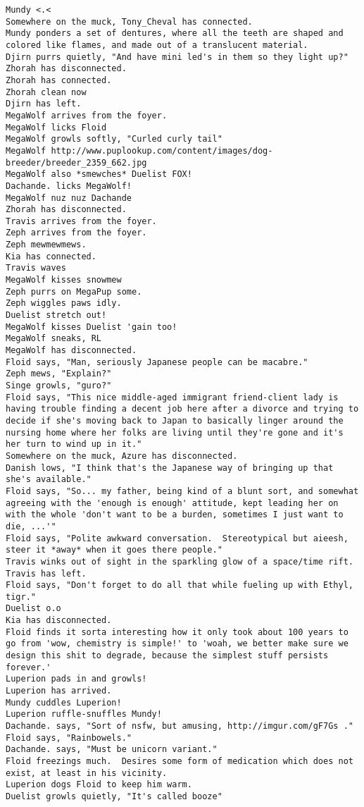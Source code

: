 \begin{verbatim}
Mundy <.<
Somewhere on the muck, Tony_Cheval has connected.
Mundy ponders a set of dentures, where all the teeth are shaped and colored like flames, and made out of a translucent material.
Djirn purrs quietly, "And have mini led's in them so they light up?"
Zhorah has disconnected.
Zhorah has connected.
Zhorah clean now
Djirn has left.
MegaWolf arrives from the foyer.
MegaWolf licks Floid
MegaWolf growls softly, "Curled curly tail"
MegaWolf http://www.puplookup.com/content/images/dog-breeder/breeder_2359_662.jpg
MegaWolf also *smewches* Duelist FOX!
Dachande. licks MegaWolf!
MegaWolf nuz nuz Dachande
Zhorah has disconnected.
Travis arrives from the foyer.
Zeph arrives from the foyer.
Zeph mewmewmews.
Kia has connected.
Travis waves
MegaWolf kisses snowmew
Zeph purrs on MegaPup some.
Zeph wiggles paws idly.
Duelist stretch out!
MegaWolf kisses Duelist 'gain too!
MegaWolf sneaks, RL
MegaWolf has disconnected.
Floid says, "Man, seriously Japanese people can be macabre."
Zeph mews, "Explain?"
Singe growls, "guro?"
Floid says, "This nice middle-aged immigrant friend-client lady is having trouble finding a decent job here after a divorce and trying to decide if she's moving back to Japan to basically linger around the nursing home where her folks are living until they're gone and it's her turn to wind up in it."
Somewhere on the muck, Azure has disconnected.
Danish lows, "I think that's the Japanese way of bringing up that she's available."
Floid says, "So... my father, being kind of a blunt sort, and somewhat agreeing with the 'enough is enough' attitude, kept leading her on with the whole 'don't want to be a burden, sometimes I just want to die, ...'"
Floid says, "Polite awkward conversation.  Stereotypical but aieesh, steer it *away* when it goes there people."
Travis winks out of sight in the sparkling glow of a space/time rift.
Travis has left.
Floid says, "Don't forget to do all that while fueling up with Ethyl, tigr."
Duelist o.o
Kia has disconnected.
Floid finds it sorta interesting how it only took about 100 years to go from 'wow, chemistry is simple!' to 'woah, we better make sure we design this shit to degrade, because the simplest stuff persists forever.'
Luperion pads in and growls!
Luperion has arrived.
Mundy cuddles Luperion!
Luperion ruffle-snuffles Mundy!
Dachande. says, "Sort of nsfw, but amusing, http://imgur.com/gF7Gs ."
Floid says, "Rainbowels."
Dachande. says, "Must be unicorn variant."
Floid freezings much.  Desires some form of medication which does not exist, at least in his vicinity.
Luperion dogs Floid to keep him warm.
Duelist growls quietly, "It's called booze"

\end{verbatim}
